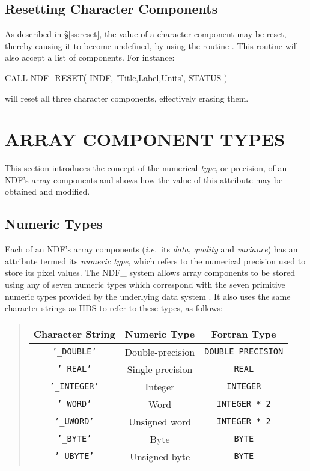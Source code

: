 \documentclass[twoside,11pt,nolof]{starlink}
\providecommand{\st}[1]{{\emph{#1}}}
\providecommand{\hi}[1]{{\texttt{#1}}}
\begin{document}
\subsection{Resetting Character Components}

As described in \S\ref{ss:reset}, the value of a character component may be
reset, thereby causing it to become undefined, by using the routine .
This routine will also accept a list of components.
For instance:

\small
\begin{terminalv}
      CALL NDF_RESET( INDF, 'Title,Label,Units', STATUS )
\end{terminalv}
\normalsize

will reset all three character components, effectively erasing them.


\section{ARRAY COMPONENT TYPES}

This section introduces the concept of the numerical \st{type}, or
precision, of an NDF's array components and shows how the value of
this attribute may be obtained and modified.

\subsection{\label{ss:numerictypes}Numeric Types}

Each of an NDF's array components (\st{i.e.}\ its \st{data},
\st{quality\/} and \st{variance\/}) has an attribute termed its \st{numeric
type}, which refers to the numerical precision used to store its pixel
values.
The NDF\_ system allows array components to be stored using any of seven
numeric types which correspond with the seven primitive numeric types
provided by the underlying data system .
It also uses the same character strings as HDS to refer to these
types, as follows:

\small
\begin{quote}
\begin{center}
\begin{tabular}{|c|c|c|}
\hline
\textbf{Character String} & \textbf{Numeric Type} & \textbf{Fortran Type}\\
\hline \hline
\hi{'\_DOUBLE'} & Double-precision & \hi{DOUBLE PRECISION}\\
\hi{'\_REAL'} & Single-precision & \hi{REAL}\\
\hi{'\_INTEGER'} & Integer & \hi{INTEGER}\\
\hi{'\_WORD'} & Word & \hi{INTEGER * 2}\\
\hi{'\_UWORD'} & Unsigned word & \hi{INTEGER * 2}\\
\hi{'\_BYTE'} & Byte & \hi{BYTE}\\
\hi{'\_UBYTE'} & Unsigned byte & \hi{BYTE}\\
\hline
\end{tabular}
\end{center}
\end{quote}
\normalsize
\end{document}
